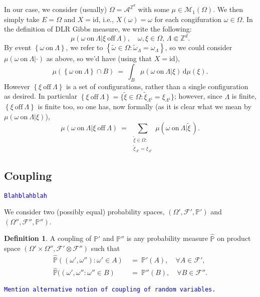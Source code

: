 \documentclass[12pt]{article}
\newcommand{\A}{\mathcal{A}}
\renewcommand{\d}{\mathrm{d}}
\newcommand{\F}{\mathcal{F}}
\newcommand{\M}{\mathcal{M}}
\renewcommand{\P}{\mathbb{P}}
\newcommand{\Z}{\mathbb{Z}}
\newcommand{\set}[1]{\left\{#1\right\}}
\newcommand{\pika}{\boldsymbol{\cdot}}
\newcommand{\1}{\mathbbm{1}}
\renewcommand{\c}{\mathsf{c}}
\newcommand{\5}{\vspace{0.5cm}}
\renewcommand{\tilde}{\widetilde}
\renewcommand{\hat}{\widehat}
\theoremstyle{definition}
\newtheorem{df}[thm]{Definition}
\begin{document}
In our case, we consider (usually) $\Omega=\A^{\Z^d}$ with some $\mu\in\M_1(\Omega)$. We then simply take $E=\Omega$ and $X=\mathrm{id}$, i.e., $X(\omega)=\omega$ for each congifuration $\omega\in\Omega$. In the definition of DLR Gibbs measure, we write the following:
$$\mu(\omega~\text{on}~\Lambda|\xi~\text{off}~\Lambda),\quad \omega,\xi\in\Omega,\,\Lambda\Subset\Z^d.$$
By event $\set{\omega~\text{on}~\Lambda}$, we refer to $\set{\tilde{\omega}\in\Omega:\tilde{\omega}_\Lambda=\omega_\Lambda}$, so we could consider $\mu(\omega~\text{on}~\Lambda|\pika)$ as above, so we'd have (using that $X=\mathrm{id}$),
$$\mu(\set{\omega~\text{on}~\Lambda}\cap B) ~=~ \int_B \mu(\omega~\text{on}~\Lambda|\xi)\,\d\mu(\xi).$$
However $\set{\xi~\text{off}~\Lambda}$ is a set of configurations, rather than a single configuration as desired. In particular $\set{\xi~\text{off}~\Lambda}=\{\tilde{\xi}\in\Omega:\tilde{\xi}_{\Lambda^\c}=\xi_{\Lambda^\c}\}$; however, since $\Lambda$ is finite, $\set{\xi~\text{off}~\Lambda}$ is finite too, so one has, now formally (as it is clear what we mean by $\mu(\omega~\text{on}~\Lambda|\xi)$),
$$\mu(\omega~\text{on}~\Lambda|\xi~\text{off}~\Lambda) ~=~ \sum_{\substack{\tilde{\xi}\in\Omega:\\\tilde{\xi}_{\Lambda^\c}=\xi_{\Lambda^\c}}}\mu(\omega~\text{on}~\Lambda|\tilde{\xi}\,).$$ 


\subsection{Coupling}\label{app:2}

\textcolor{blue}{\texttt{Blahblahblah}} %

We consider two (possibly equal) probability spaces, $(\Omega',\F',\P')$ and $(\Omega'',\F'',\P'')$.

\begin{df}
A coupling of $\P'$ and $\P''$ is any probability measure $\hat{\P}$ on product space $(\Omega'\times\Omega'',\F'\otimes\F'')$ such that 
\begin{align*}
\hat{\P}((\omega',\omega''):\omega'\in A) ~&=~ \P'(A), \quad \forall A\in\F', \\
\hat{\P}((\omega',\omega'':\omega''\in B) ~&=~ \P''(B), \quad \forall B\in\F''.
\end{align*}
\end{df}

\textcolor{blue}{\texttt{Mention alternative notion of coupling of random variables.}}
\end{document}
